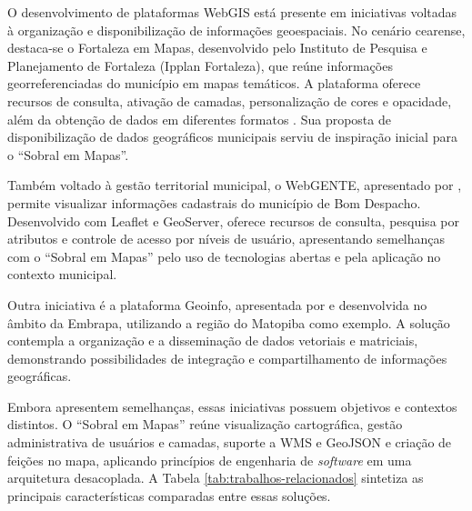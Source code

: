 O desenvolvimento de plataformas \gls{WebGIS} está presente em iniciativas voltadas à organização e disponibilização de informações geoespaciais. No cenário cearense, destaca-se o Fortaleza em Mapas, desenvolvido pelo Instituto de Pesquisa e Planejamento de Fortaleza (Ipplan Fortaleza), que reúne informações georreferenciadas do município em mapas temáticos. A plataforma oferece recursos de consulta, ativação de camadas, personalização de cores e opacidade, além da obtenção de dados em diferentes formatos \cite{IpplanFortalezaMapas}. Sua proposta de disponibilização de dados geográficos municipais serviu de inspiração inicial para o ``Sobral em Mapas''.

Também voltado à gestão territorial municipal, o WebGENTE, apresentado por , permite visualizar informações cadastrais do município de Bom Despacho. Desenvolvido com Leaflet e GeoServer, oferece recursos de consulta, pesquisa por atributos e controle de acesso por níveis de usuário, apresentando semelhanças com o ``Sobral em Mapas'' pelo uso de tecnologias abertas e pela aplicação no contexto municipal.

Outra iniciativa é a plataforma Geoinfo, apresentada por  e desenvolvida no âmbito da Embrapa, utilizando a região do Matopiba como exemplo. A solução contempla a organização e a disseminação de dados vetoriais e matriciais, demonstrando possibilidades de integração e compartilhamento de informações geográficas.

Embora apresentem semelhanças, essas iniciativas possuem objetivos e contextos distintos. O ``Sobral em Mapas'' reúne visualização cartográfica, gestão administrativa de usuários e camadas, suporte a \gls{WMS} e GeoJSON e criação de feições no mapa, aplicando princípios de engenharia de \textit{software} em uma arquitetura desacoplada. A Tabela \ref{tab:trabalhos-relacionados} sintetiza as principais características comparadas entre essas soluções.

